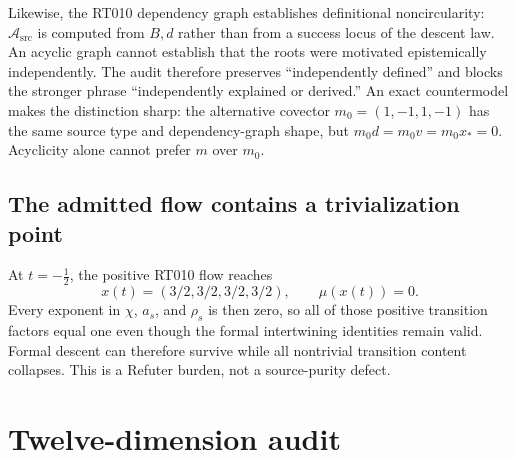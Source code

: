 \documentclass[11pt]{article}
\newcommand{\Asrc}{\mathcal{A}_{\mathrm{src}}}
\begin{document}
Likewise, the RT010 dependency graph establishes definitional noncircularity:
$\Asrc$ is computed from $B,d$ rather than from a success locus of the descent
law.  An acyclic graph cannot establish that the roots were motivated
epistemically independently.  The audit therefore preserves ``independently
defined'' and blocks the stronger phrase ``independently explained or derived.''
An exact countermodel makes the distinction sharp: the alternative covector
$m_0=(1,-1,1,-1)$ has the same source type and dependency-graph shape, but
$m_0d=m_0v=m_0x_*=0$.  Acyclicity alone cannot prefer $m$ over $m_0$.

\subsection{The admitted flow contains a trivialization point}

At $t=-\tfrac12$, the positive RT010 flow reaches
\[
 x(t)=(3/2,3/2,3/2,3/2),\qquad \mu(x(t))=0.
\]
Every exponent in $\chi$, $a_s$, and $\rho_s$ is then zero, so all of those
positive transition factors equal one even though the formal intertwining
identities remain valid.  Formal descent can therefore survive while all
nontrivial transition content collapses.  This is a Refuter burden, not a
source-purity defect.

\section{Twelve-dimension audit}
\end{document}
